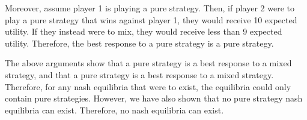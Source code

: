 \documentclass[11pt]{article} %
\begin{document}
Moreover, assume player 1 is playing a pure strategy. Then, if player 2 were to play a pure strategy that wins against player 1, they would receive 10 expected utility. If they instead were to mix, they would receive less than 9 expected utility. Therefore, the best response to a pure strategy is a pure strategy.

The above arguments show that a pure strategy is a best response to a mixed strategy, and that a pure strategy is a best response to a mixed strategy. Therefore, for any nash equilibria that were to exist, the equilibria could only contain pure strategies. However, we have also shown that no pure strategy nash equilibria can exist. Therefore, no nash equilibria can exist.
\end{document}
